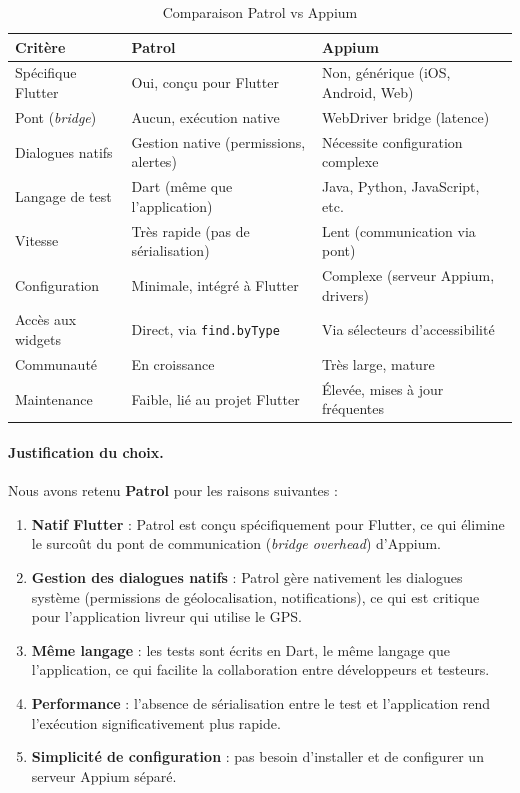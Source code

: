 \begin{table}[H]
\centering
\caption{Comparaison Patrol vs Appium}
\label{tab:patrol-vs-appium}
\renewcommand{\arraystretch}{1.3}
\begin{tabularx}{\textwidth}{|l|X|X|}
\hline
\rowcolor{speedlineBlue!15}
\textbf{Critère} & \textbf{Patrol} & \textbf{Appium} \\
\hline
Spécifique Flutter & Oui, conçu pour Flutter & Non, générique (iOS, Android, Web) \\
\hline
Pont (\textit{bridge}) & Aucun, exécution native & WebDriver bridge (latence) \\
\hline
Dialogues natifs & Gestion native (permissions, alertes) & Nécessite configuration complexe \\
\hline
Langage de test & Dart (même que l'application) & Java, Python, JavaScript, etc. \\
\hline
Vitesse & Très rapide (pas de sérialisation) & Lent (communication via pont) \\
\hline
Configuration & Minimale, intégré à Flutter & Complexe (serveur Appium, drivers) \\
\hline
Accès aux widgets & Direct, via \texttt{find.byType} & Via sélecteurs d'accessibilité \\
\hline
Communauté & En croissance & Très large, mature \\
\hline
Maintenance & Faible, lié au projet Flutter & Élevée, mises à jour fréquentes \\
\hline
\end{tabularx}
\end{table}

\paragraph{Justification du choix.}
Nous avons retenu \textbf{Patrol} pour les raisons suivantes :
\begin{enumerate}[nosep]
    \item \textbf{Natif Flutter} : Patrol est conçu spécifiquement pour Flutter, ce qui élimine le surcoût du pont de communication (\textit{bridge overhead}) d'Appium.
    \item \textbf{Gestion des dialogues natifs} : Patrol gère nativement les dialogues système (permissions de géolocalisation, notifications), ce qui est critique pour l'application livreur qui utilise le GPS.
    \item \textbf{Même langage} : les tests sont écrits en Dart, le même langage que l'application, ce qui facilite la collaboration entre développeurs et testeurs.
    \item \textbf{Performance} : l'absence de sérialisation entre le test et l'application rend l'exécution significativement plus rapide.
    \item \textbf{Simplicité de configuration} : pas besoin d'installer et de configurer un serveur Appium séparé.
\end{enumerate}

